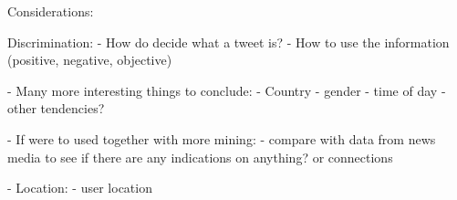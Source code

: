 \documentclass[Main]{subfiles}
\begin{document}
Considerations:



Discrimination:
- How do decide what a tweet is?
- How to use the information (positive, negative, objective)





- Many more interesting things to conclude:
    - Country
    - gender
    - time of day
    - other tendencies?
    
- If were to used together with more mining:
    - compare with data from news media to see if there are any indications on anything? or connections


- Location:
    - user location
\end{document}
